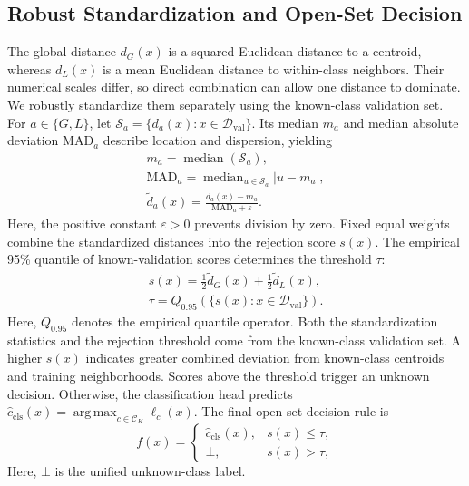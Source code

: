 \subsection{Robust Standardization and Open-Set Decision}
The global distance $d_G(x)$ is a squared Euclidean distance to a centroid, whereas $d_L(x)$ is a mean Euclidean distance to within-class neighbors. Their numerical scales differ, so direct combination can allow one distance to dominate. We robustly standardize them separately using the known-class validation set. For $a\in\{G,L\}$, let $\mathcal{S}_a=\{d_a(x):x\in\mathcal{D}_{\mathrm{val}}\}$. Its median $m_a$ and median absolute deviation $\mathrm{MAD}_a$ describe location and dispersion, yielding
\begin{equation}
\begin{gathered}
m_a=\operatorname{median}(\mathcal{S}_a),\\
\mathrm{MAD}_a=\operatorname{median}_{u\in\mathcal{S}_a}|u-m_a|,
\\
\tilde d_a(x)=\frac{d_a(x)-m_a}{\mathrm{MAD}_a+\varepsilon}.
\end{gathered}\tag{13}
\end{equation}
Here, the positive constant $\varepsilon>0$ prevents division by zero. Fixed equal weights combine the standardized distances into the rejection score $s(x)$. The empirical 95\% quantile of known-validation scores determines the threshold $\tau$:
\begin{equation}
\begin{gathered}
s(x)=\frac{1}{2}\tilde d_G(x)+\frac{1}{2}\tilde d_L(x),
\\
\tau=Q_{0.95}\left(\{s(x):x\in\mathcal{D}_{\mathrm{val}}\}\right).
\end{gathered}\tag{14}
\end{equation}
Here, $Q_{0.95}$ denotes the empirical quantile operator. Both the standardization statistics and the rejection threshold come from the known-class validation set. A higher $s(x)$ indicates greater combined deviation from known-class centroids and training neighborhoods. Scores above the threshold trigger an unknown decision. Otherwise, the classification head predicts $\hat c_{\mathrm{cls}}(x)=\operatorname*{arg\,max}_{c\in\mathcal C_K}\ell_c(x)$. The final open-set decision rule is
\begin{equation}
f(x)=
\begin{cases}
\hat c_{\mathrm{cls}}(x), & s(x)\le\tau,\\
\bot, & s(x)>\tau,
\end{cases}
\tag{15}
\end{equation}
Here, $\bot$ is the unified unknown-class label.
